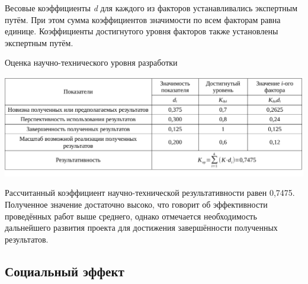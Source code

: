 Весовые коэффициенты \textit{d} для каждого из факторов устанавливались экспертным путём. При этом сумма коэффициентов значимости по всем факторам равна единице. Коэффициенты достигнутого уровня факторов также установлены экспертным путём.

\begin{table}[!ht]
\caption{Оценка научно-технического уровня разработки}
\centering
\includegraphics[page=1, width=1\linewidth]{econom_5.pdf}
\label{tab:eco_10}
\end{table}
Рассчитанный коэффициент научно-технической результативности равен 0,7475. Полученное значение достаточно высоко, что говорит об эффективности проведённых работ выше среднего, однако отмечается необходимость дальнейшего развития проекта для достижения завершённости полученных результатов.

\subsection{Социальный эффект}



\clearpage